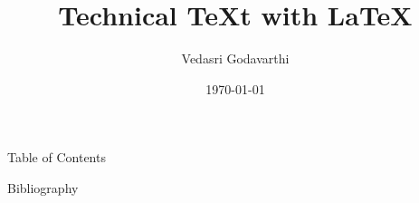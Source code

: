\documentclass[
10pt, 
xcolor=x11names,
aspectratio=169,
]{beamer}
\title{Technical TeXt with \LaTeX}
\subtitle{}
\author{Vedasri Godavarthi}
\date{\today}
\begin{document}
\frame[plain]{\titlepage}

\begin{frame}{Table of Contents}
\tableofcontents
\end{frame}




\begin{frame}[allowframebreaks]{Bibliography}
\printbibliography
\end{frame}

\end{document}
